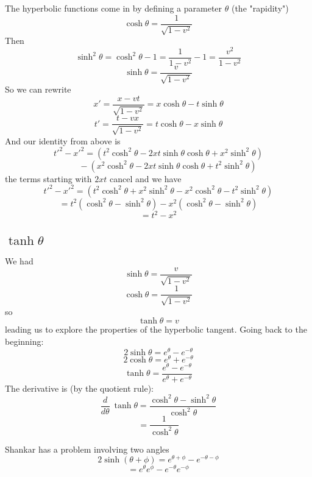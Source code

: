 \documentclass[11pt, oneside]{article}   	%
\begin{document}
The hyperbolic functions come in by defining a parameter $\theta$ (the "rapidity")
\[ \cosh \theta = \frac{1}{\sqrt{1-v^2}} \]
Then
\[ \sinh^2 \theta = \cosh^2 \theta - 1 = \frac{1}{1-v^2} - 1 = \frac{v^2}{1-v^2} \]
\[ \sinh \theta =  \frac{v}{\sqrt{1-v^2}} \]
So we can rewrite
\[ x' = \frac{x - vt}{\sqrt{1-v^2}} = x \cosh \theta - t \sinh \theta \]
\[ t' = \frac{t - vx}{\sqrt{1-v^2}} = t \cosh \theta - x \sinh \theta  \]
And our identity from above is
\[ t'^2 - x'^2 = (t^2 \cosh^2 \theta - 2xt \sinh \theta \cosh \theta + x^2 \sinh^2 \theta) \]
\[ \ \ \ \ \ \ \ \ \ \ - (x^2 \cosh^2 \theta - 2xt \sinh \theta \cosh \theta + t^2 \sinh^2 \theta) \]
the terms starting with $2xt$ cancel and we have
\[ t'^2 - x'^2 = (t^2 \cosh^2 \theta + x^2 \sinh^2 \theta - x^2 \cosh^2 \theta - t^2 \sinh^2 \theta) \]
\[ = t^2 (\cosh^2 \theta -  \sinh^2 \theta) - x^2  (\cosh^2 \theta -  \sinh^2 \theta) \]
\[ = t^2 - x^2  \]
\subsection*{$\tanh \theta$}
We had
\[ \sinh \theta =  \frac{v}{\sqrt{1-v^2}} \]
\[ \cosh \theta = \frac{1}{\sqrt{1-v^2}} \]
so 
\[ \tanh \theta = v \]
leading us to explore the properties of the hyperbolic tangent.  Going back to the beginning:
\[ 2 \sinh \theta = e^{\theta} -  e^{-\theta} \]
\[ 2 \cosh \theta = e^{\theta} +  e^{-\theta}  \]
\[ \tanh \theta = \frac{e^{\theta} -  e^{-\theta}}{e^{\theta} +  e^{-\theta}} \]
The derivative is (by the quotient rule):
\[ \frac{d}{d\theta} \ \tanh \theta = \frac{\cosh^2 \theta - \sinh^2 \theta}{\cosh^2 \theta}  \]
\[ =  \frac{1}{\cosh^2 \theta}  \]

Shankar has a problem involving two angles
\[ 2 \sinh ( \theta + \phi) = e^{\theta + \phi} -  e^{-\theta - \phi} \]
\[ = e^{\theta} e^{\phi} - e^{-\theta} e^{- \phi} \]
\end{document}
